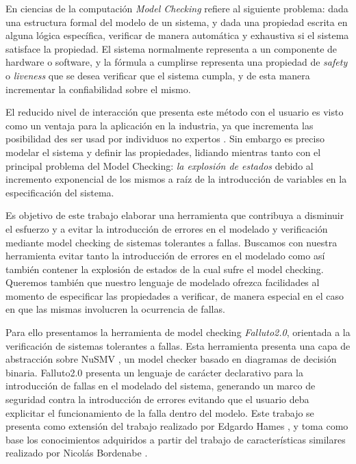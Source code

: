 \documentclass[titlepage, 12pt]{book}
\begin{document}
En ciencias de la computaci\'on \emph{Model Checking} refiere al siguiente problema: dada una estructura formal del modelo de un sistema, y dada una propiedad escrita en alguna l\'ogica espec\'ifica, verificar de manera autom\'atica y exhaustiva si el sistema satisface la propiedad. El sistema normalmente representa a un componente de hardware o software, y la f\'ormula a cumplirse representa una propiedad de \emph{safety} o \emph{liveness} que se desea verificar que el sistema cumpla, y de esta manera incrementar la confiabilidad sobre el mismo.

El reducido nivel de interacci\'on que presenta este m\'etodo con el usuario es visto como un ventaja para la aplicaci\'on en la industria, ya que incrementa las posibilidad des ser usad por individuos no expertos \cite{RuysBrinksma}. %
Sin embargo es preciso modelar el sistema y definir las propiedades, lidiando mientras tanto con el principal problema del Model Checking: \emph{la explosi\'on de estados} debido al incremento exponencial de los mismos a ra\'iz de la introducci\'on de variables en la especificaci\'on del sistema.


Es objetivo de este trabajo elaborar una herramienta que contribuya a disminuir el esfuerzo y a evitar la introducci\'on de errores en el modelado y verificaci\'on mediante model checking de sistemas tolerantes a fallas. Buscamos con nuestra herramienta evitar tanto la introducci\'on de errores en el modelado como as\'i tambi\'en contener la explosi\'on de estados de la cual sufre el model checking. Queremos tambi\'en que nuestro lenguaje de modelado ofrezca facilidades al momento de especificar las propiedades a verificar, de manera especial en el caso en que las mismas involucren la ocurrencia de fallas.

Para ello presentamos la herramienta de model checking \emph{Falluto2.0}, orientada a la verificaci\'on de sistemas tolerantes a fallas. Esta herramienta presenta una capa de abstracci\'on sobre NuSMV \cite{NuSMV}, un model checker basado en diagramas de decisi\'on binaria. Falluto2.0 presenta un lenguaje de car\'acter declarativo para la introducci\'on de fallas en el modelado del sistema, generando un marco de seguridad contra la introducci\'on de errores evitando que el usuario deba explicitar el funcionamiento de la falla dentro del modelo. Este trabajo se presenta como extensi\'on del trabajo realizado por Edgardo Hames \cite{Hames}, y toma como base los conocimientos adquiridos a partir del trabajo de caracter\'isticas similares realizado por Nicol\'as Bordenabe \cite{Bordenabe}.
\end{document}
